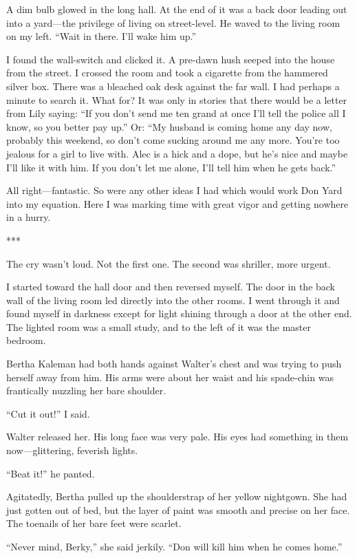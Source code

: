 \documentclass{novel}
\begin{document}
{A dim bulb glowed in the long hall. At the end of it was a back door leading out into a yard—the privilege of living on street-level. He waved to the living room on my left. “Wait in there. I’ll wake him up.”

I found the wall-switch and clicked it. A pre-dawn hush seeped into the house from the street. I crossed the room and took a cigarette from the hammered silver box. There was a bleached oak desk against the far wall. I had perhaps a minute to search it. What for? It was only in stories that there would be a letter from Lily saying: “If you don’t send me ten grand at once I’ll tell the police all I know, so you better pay up.” Or: “My husband is coming home any day now, probably this weekend, so don’t come sucking around me any more. You’re too jealous for a girl to live with. Alec is a hick and a dope, but he’s nice and maybe I’ll like it with him. If you don’t let me alone, I’ll tell him when he gets back.”

All right—fantastic. So were any other ideas I had which would work Don Yard into my equation. Here I was marking time with great vigor and getting nowhere in a hurry.

***

The cry wasn’t loud. Not the first one. The second was shriller, more urgent.

I started toward the hall door and then reversed myself. The door in the back wall of the living room led directly into the other rooms. I went through it and found myself in darkness except for light shining through a door at the other end. The lighted room was a small study, and to the left of it was the master bedroom.

Bertha Kaleman had both hands against Walter’s chest and was trying to push herself away from him. His arms were about her waist and his spade-chin was frantically nuzzling her bare shoulder.

“Cut it out!” I said.

Walter released her. His long face was very pale. His eyes had something in them now—glittering, feverish lights.

“Beat it!” he panted.

Agitatedly, Bertha pulled up the shoulderstrap of her yellow nightgown. She had just gotten out of bed, but the layer of paint was smooth and precise on her face. The toenails of her bare feet were scarlet.

“Never mind, Berky,” she said jerkily. “Don will kill him when he comes home.”

}
\end{document}
